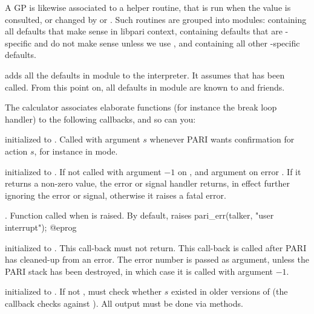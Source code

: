 A GP  is likewise associated to a helper routine, that is run
when the value is consulted, or changed by  or .
Such routines are grouped into modules:  containing all
defaults that make sense in libpari context, 
containing defaults that are -specific and do not make sense unless
we use , and  containing all other
-specific defaults.

 adds all the defaults in
module  to the interpreter. It assumes that  has
been called. From this point on, all defaults in module  are known
to  and friends.


The  calculator associates elaborate functions (for instance the
break loop handler) to the following callbacks, and so can you:

initialized to . Called with argument $s$ whenever PARI wants
confirmation for action $s$, for instance in  mode.

initialized to . If not  called with argument $-1$
on , and argument  on error . If it returns a
non-zero value, the error or signal handler returns, in effect further
ignoring the error or signal, otherwise it raises a fatal error.

.
Function called when  is raised. By default, raises
\bprog
  pari_err(talker, "user interrupt");
@eprog

initialized to . This call-back must not return.
This call-back is called after PARI has cleaned-up from an error.
The error number is passed as argument, unless the PARI stack
has been destroyed, in which case it is called with argument $-1$.

initialized to . If not , must check whether
$s$ existed in older versions of  (the  callback
checks against ). All output must be done via 
methods.

